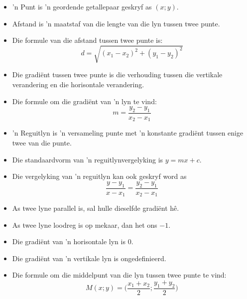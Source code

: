 \summary{}
\begin{itemize}[noitemsep]
\item 'n Punt is 'n geordende getallepaar geskryf as $(x;y)$.
\item Afstand is 'n maatstaf van die lengte van die lyn tussen twee punte.
\item Die formule van die afstand tussen twee punte is: 
\begin{equation*}
d=\sqrt{{({x}_{1}-{x}_{2})}^{2}+{({y}_{1}-{y}_{2})}^{2}}
\end{equation*}
\item Die gradi\"ent tussen twee punte is die verhouding tussen die vertikale verandering en die horisontale verandering.

\item Die formule om die gradiënt van ’n lyn te vind: 
\begin{equation*}
m=\frac{{y}_{2}-{y}_{1}}{{x}_{2}-{x}_{1}}
\end{equation*}
\item 'n Reguitlyn is 'n versameling punte met 'n konstante gradi\"ent tussen enige twee van die punte.
\item Die standaardvorm van 'n reguitlynvergelyking is $y=mx+c$.
\item Die vergelyking van 'n reguitlyn kan ook geskryf word as
\begin{equation*}
\dfrac{y-y_1}{x-x_1}=\dfrac{y_2-y_1}{x_2-x_1}\end{equation*}
\item As twee lyne parallel is, sal hulle dieselfde gradiënt hê.
\item As twee lyne loodreg is op mekaar,
dan het ons $-1$.
\item Die gradi\"ent van 'n horisontale lyn is $0$.
\item Die gradi\"ent van 'n vertikale lyn is ongedefinieerd.
\item Die formule om die middelpunt van die lyn tussen twee punte te vind: 
\begin{equation*}
M(x;y) = \Big(\frac{{x}_{1}+{x}_{2}}{2};\frac{{y}_{1}+{y}_{2}}{2}\Big)
\end{equation*}
\end{itemize}


